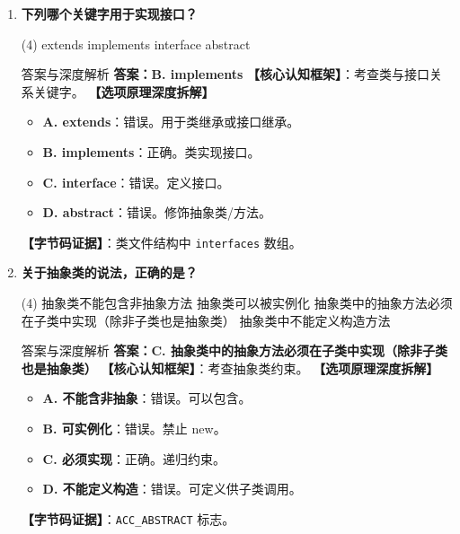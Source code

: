 ﻿\documentclass[12pt, a4paper]{ctexart}
\newcommand{\code}[1]{\texttt{#1}}
\begin{document}
\begin{enumerate}[label=\textbf{\arabic*.}, itemsep=1em]
	\item \textbf{下列哪个关键字用于实现接口？}
	      \begin{tasks}(4)
		      \task extends \task implements \task interface \task abstract
	      \end{tasks}
	      \begin{bluebox}{答案与深度解析}
		      \textbf{答案：B. implements}
		      \textbf{【核心认知框架】}：考查类与接口关系关键字。
		      \textbf{【选项原理深度拆解】}
		      \begin{itemize}[leftmargin=*, nosep]
			      \item \textbf{A. extends}：错误。用于类继承或接口继承。
			      \item \textbf{B. implements}：正确。类实现接口。
			      \item \textbf{C. interface}：错误。定义接口。
			      \item \textbf{D. abstract}：错误。修饰抽象类/方法。
		      \end{itemize}
		      \textbf{【字节码证据】}：类文件结构中 \code{interfaces} 数组。
	      \end{bluebox}

	\item \textbf{关于抽象类的说法，正确的是？}
	      \begin{tasks}(4)
		      \task 抽象类不能包含非抽象方法
		      \task 抽象类可以被实例化
		      \task 抽象类中的抽象方法必须在子类中实现（除非子类也是抽象类）
		      \task 抽象类中不能定义构造方法
	      \end{tasks}
	      \begin{bluebox}{答案与深度解析}
		      \textbf{答案：C. 抽象类中的抽象方法必须在子类中实现（除非子类也是抽象类）}
		      \textbf{【核心认知框架】}：考查抽象类约束。
		      \textbf{【选项原理深度拆解】}
		      \begin{itemize}[leftmargin=*, nosep]
			      \item \textbf{A. 不能含非抽象}：错误。可以包含。
			      \item \textbf{B. 可实例化}：错误。禁止 new。
			      \item \textbf{C. 必须实现}：正确。递归约束。
			      \item \textbf{D. 不能定义构造}：错误。可定义供子类调用。
		      \end{itemize}
		      \textbf{【字节码证据】}：\code{ACC\_ABSTRACT} 标志。
	      \end{bluebox}


\end{enumerate}
\end{document}

